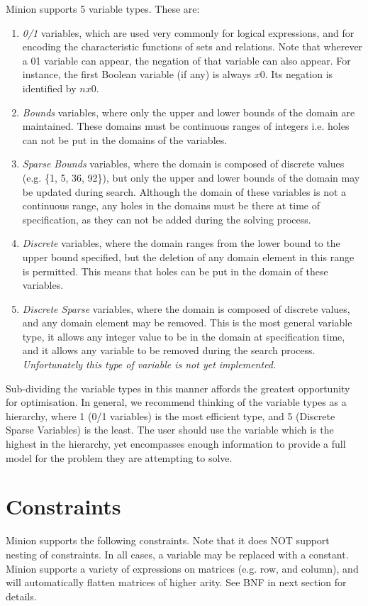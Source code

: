 \documentclass{article}
\begin{document}
\begin{small}
{\sc Minion} supports 5 variable types. These are: 
\begin{enumerate}
\item \emph{0/1} variables, which are used very commonly for logical
expressions, and for encoding the characteristic functions of sets and
relations. Note that wherever a 01 variable can appear, the negation
of that variable can also appear. For instance, the first Boolean
variable (if any) is always $x0$. Its negation is identified by $nx0$.
\item \emph{Bounds} variables, where only the upper and lower bounds
of the domain are maintained. These domains must be continuous ranges
of integers i.e. holes can not be put in the domains of the variables.
\item \emph{Sparse Bounds} variables, where the domain is composed of
discrete values (e.g. \{1, 5, 36, 92\}), but only the upper and lower
bounds of the domain may be updated during search. Although the domain
of these variables is not a continuous range, any holes in the domains
must be there at time of specification, as they can not be added
during the solving process.
\item \emph{Discrete} variables, where the domain ranges from the
lower bound to the upper bound specified, but the deletion of any
domain element in this range is permitted. This means that holes can
be put in the domain of these variables.
\item \emph{Discrete Sparse} variables, where the domain is composed of discrete values, and any domain element may be removed. This is the most general variable type, it allows any integer value to be in the domain at specification time, and it allows any variable to be removed during the search process.
{\emph{Unfortunately this type of variable is not yet implemented.}}
\end{enumerate}
Sub-dividing the variable types in this manner affords the greatest opportunity for optimisation. In general, we recommend thinking of the variable types as a hierarchy, where 1 (0/1 variables) is the most efficient type, and 5 (Discrete Sparse Variables) is the least. The user should use the variable which is the highest in the hierarchy, yet encompasses enough information to provide a full model for the problem they are attempting to solve.

\section{Constraints}\label{sect_constraints}
{\sc Minion} supports the following constraints. Note that it does NOT
support nesting of constraints. In all cases, a variable may be
replaced with a constant. {\sc Minion} supports a variety of
expressions on matrices (e.g. row, and column), and will automatically
flatten matrices of higher arity. See BNF in next section for details.



\end{small}
\end{document}
